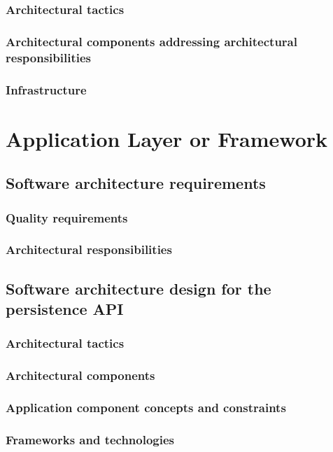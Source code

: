 \documentclass[a4paper,12pt]{report}
\begin{document}
\subsubsection {Architectural tactics}
\subsubsection {Architectural components addressing architectural responsibilities}

\subsubsection {Infrastructure}

\section {Application Layer or Framework}
\subsection {Software architecture requirements}
\subsubsection {Quality requirements}
\subsubsection {Architectural responsibilities}

\subsection {Software architecture design for the persistence API}
\subsubsection {Architectural tactics}
\subsubsection {Architectural components}
\subsubsection {Application component concepts and constraints}
\subsubsection {Frameworks and technologies}
\end{document}
